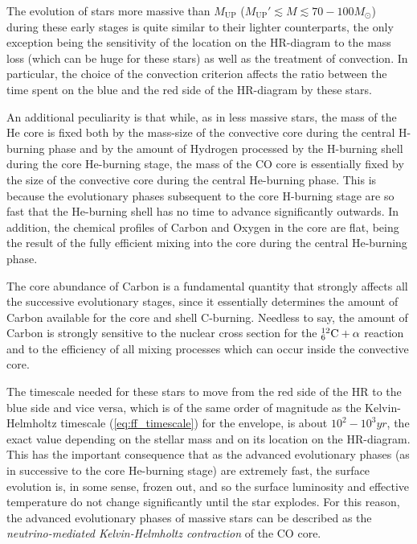 The evolution of stars more massive than $M_{\text{UP}}$ ($M_{\text{UP}}' \lesssim M \lesssim 70-100M_{\odot}$) during these early stages is quite similar to their lighter counterparts, the only exception being the sensitivity of the location on the HR-diagram to the mass loss (which can be huge for these stars) as well as the treatment of convection. In particular, the choice of the convection criterion affects the ratio between the time spent on the blue and the red side of the HR-diagram by these stars.
\par An additional peculiarity is that while, as in less massive stars, the mass of the He core is fixed both by the mass-size of the convective core during the central H-burning phase and by the amount of Hydrogen processed by the H-burning shell during the core He-burning stage, the mass of the CO core is essentially fixed by the size of the convective core during the central He-burning phase. This is because the evolutionary phases subsequent to the core H-burning stage are so fast that the He-burning shell has no time to advance significantly outwards. In addition, the chemical profiles of Carbon and Oxygen in the core are flat, being the result of the fully efficient mixing into the core during the central He-burning phase.
\par The core abundance of Carbon is a fundamental quantity that strongly affects all the successive evolutionary stages, since it essentially determines the amount of Carbon available for the core and shell C-burning. Needless to say, the amount of Carbon is strongly sensitive to the nuclear cross section for the $\element{C}{12}{6}+\alpha$ reaction and to the efficiency of all mixing processes which can occur inside the convective core.
\par The timescale needed for these stars to move from the red side of the HR to the blue side and vice versa, which is of the same order of magnitude as the Kelvin-Helmholtz timescale (\ref{eq:ff_timescale}) for the envelope, is about $10^{2}-10^{3}\unit{yr}$, the exact value depending on the stellar mass and on its location on the HR-diagram. This has the important consequence that as the advanced evolutionary phases (as in successive to the core He-burning stage) are extremely fast, the surface evolution is, in some sense, frozen out, and so the surface luminosity and effective temperature do not change significantly until the star explodes. For this reason, the advanced evolutionary phases of massive stars can be described as the \emph{neutrino-mediated Kelvin-Helmholtz contraction} of the CO core.
